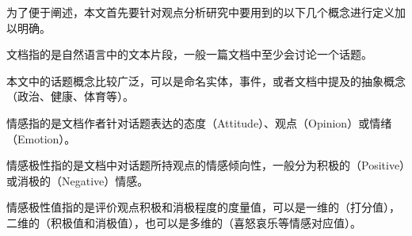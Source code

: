 为了便于阐述，本文首先要针对观点分析研究中要用到的以下几个概念进行定义加以明确。
\begin{definition}[文档(Document)]
文档指的是自然语言中的文本片段，一般一篇文档中至少会讨论一个话题。
\end{definition}
\begin{definition}[话题(Topic)]
本文中的话题概念比较广泛，可以是命名实体，事件，或者文档中提及的抽象概念（政治、健康、体育等）。
\end{definition}
\begin{definition}[情感(Sentiment)]
情感指的是文档作者针对话题表达的态度（Attitude）、观点（Opinion）或情绪（Emotion）。
\end{definition}
\begin{definition}
情感极性指的是文档中对话题所持观点的情感倾向性，一般分为积极的（Positive）或消极的（Negative）情感。
\end{definition}
\begin{definition}
情感极性值指的是评价观点积极和消极程度的度量值，可以是一维的（打分值），二维的（积极值和消极值），也可以是多维的（喜怒哀乐等情感对应值）。
\end{definition}

